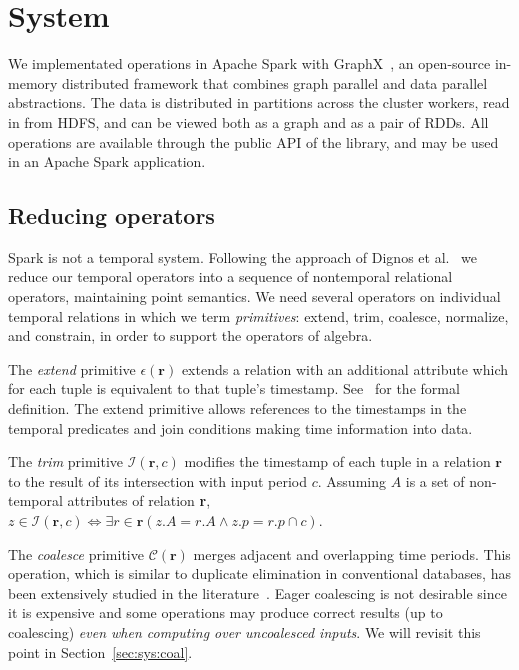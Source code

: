 \section{System}
\label{sec:sys}

We implementated \ql operations in Apache Spark with
GraphX~\cite{DBLP:conf/osdi/GonzalezXDCFS14}, an open-source in-memory
distributed framework that combines graph parallel and data parallel
abstractions.  The data is distributed in partitions across the
cluster workers, read in from HDFS, and can be viewed both as a graph
and as a pair of RDDs.  All \tg operations are available through the
public API of the \ql library, and may be used in an Apache Spark
application.

\subsection{Reducing operators}
\label{sec:sys:reduce}

Spark is not a temporal system.  Following the approach of Dignos et
al.~\cite{Dignos2012} we reduce our temporal operators into a sequence
of nontemporal relational operators, maintaining point semantics.  We
need several operators on individual temporal relations in \tve which
we term {\em primitives}: extend, trim, coalesce, normalize, and
constrain, in order to support the operators of \ql algebra.


The {\em extend} primitive $\epsilon(\mathbf{r})$ extends a relation
with an additional attribute which for each tuple is equivalent to
that tuple's timestamp.  See~\cite{Dignos2012} for the formal
definition.  The extend primitive allows references to the timestamps
in the temporal predicates and join conditions making time information
into data.

The {\em trim} primitive $\mathcal{I}(\mathbf{r},c)$ modifies the
timestamp of each tuple in a relation $\mathbf{r}$ to the result of
its intersection with input period $c$.  Assuming $A$ is a set of
non-temporal attributes of relation {\bf r}, $z \in
\mathcal{I}(\mathbf{r},c) \iff \exists r \in \mathbf{r}(z.A = r.A
\wedge z.p = r.p \cap c)$.

The {\em coalesce} primitive $\mathcal{C}(\mathbf{r})$ merges adjacent
and overlapping time periods.  This operation, which is similar to
duplicate elimination in conventional databases, has been extensively
studied in the
literature~\cite{DBLP:conf/vldb/BohlenSS96,DBLP:journals/sigmod/Zimanyi06}.
Eager coalescing is not desirable since it is expensive and some
operations may produce correct results (up to coalescing) {\em even
  when computing over uncoalesced inputs}.  We will revisit this point in
Section~\ref{sec:sys:coal}.

